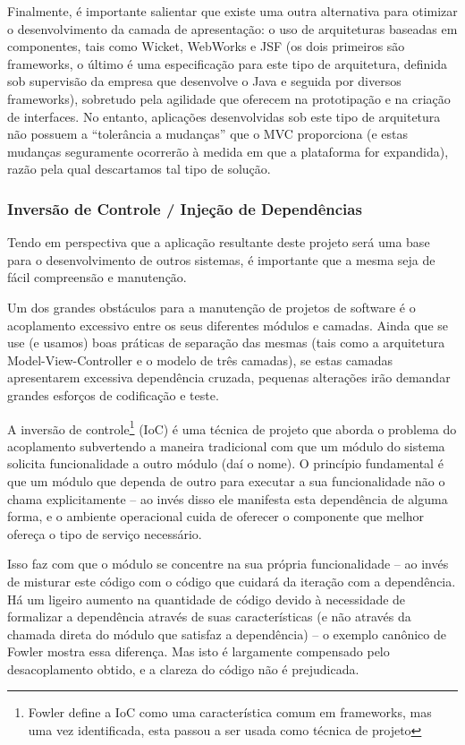 \documentclass{abnt}
\begin{document}
Finalmente, é importante salientar que existe uma outra alternativa para otimizar o desenvolvimento da camada de apresentação: o uso de arquiteturas baseadas em componentes, tais como Wicket, WebWorks e JSF (os dois primeiros são frameworks, o último é uma especificação para este tipo de arquitetura, definida sob supervisão da empresa que desenvolve o Java e seguida por diversos frameworks), sobretudo pela agilidade que oferecem na prototipação e na criação de interfaces. No entanto, aplicações desenvolvidas sob este tipo de arquitetura não possuem a “tolerância a mudanças” que o MVC proporciona (e estas mudanças seguramente ocorrerão à medida em que a plataforma for expandida), razão pela qual descartamos tal tipo de solução.

\subsubsection{Inversão de Controle / Injeção de Dependências}

Tendo em perspectiva que a aplicação resultante deste projeto será uma base para o desenvolvimento de outros sistemas, é importante que a mesma seja de fácil compreensão e manutenção.

Um dos grandes obstáculos para a manutenção de projetos de software é o acoplamento excessivo entre os seus diferentes módulos e camadas. Ainda que se use (e usamos) boas práticas de separação das mesmas (tais como a arquitetura Model-View-Controller e o modelo de três camadas), se estas camadas apresentarem excessiva dependência cruzada, pequenas alterações irão demandar grandes esforços de codificação e teste.

A inversão de controle\footnote{Fowler\cite{FowlerIoc} define a IoC como uma característica comum em frameworks, mas uma vez identificada, esta passou a ser usada como técnica de projeto } (IoC) é uma técnica de projeto que aborda o problema do acoplamento subvertendo a maneira tradicional com que um módulo do sistema solicita funcionalidade a outro módulo (daí o nome). O princípio fundamental é que um módulo que dependa de outro para executar a sua funcionalidade não o chama explicitamente – ao invés disso ele manifesta esta dependência de alguma forma, e o ambiente operacional cuida de oferecer o componente que melhor ofereça o tipo de serviço necessário.

Isso faz com que o módulo se concentre na sua própria funcionalidade – ao invés de misturar este código com o código que cuidará da iteração com a dependência. Há um ligeiro aumento na quantidade de código devido à necessidade de formalizar a dependência através de suas características (e não através da chamada direta do módulo que satisfaz a dependência) – o exemplo canônico de Fowler mostra essa diferença. Mas isto é largamente compensado pelo desacoplamento obtido, e a clareza do código não é prejudicada.
\end{document}
